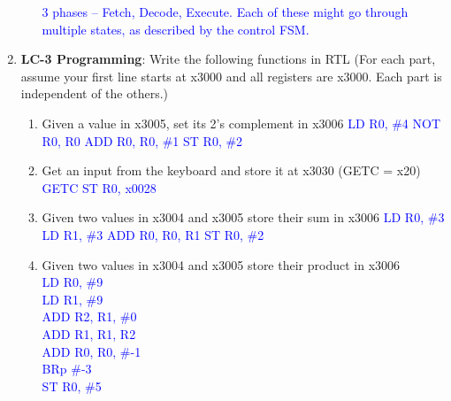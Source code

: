\documentclass{article}
\begin{document}
\begin{enumerate}[label=(\alph*)]
\begin{enumerate}[label=(\roman*),itemsep = 10pt]
            \newline \textcolor{blue}{3 phases -- Fetch, Decode, Execute. Each of these might go through multiple states, as described by the control FSM.}
        \end{enumerate}
        \item \textbf{LC-3 Programming}: Write the following functions in RTL (For each part, assume your first line starts at x3000 and all registers are x3000. Each part is independent of the others.)
        \begin{enumerate}[label=(\roman*),itemsep = 10pt]
            \item Given a value in x3005, set its 2’s complement in x3006
            \newline \textcolor{blue}{LD R0, \#4}
            \newline \textcolor{blue}{NOT R0, R0}
            \newline \textcolor{blue}{ADD R0, R0, \#1}
            \newline \textcolor{blue}{ST R0, \#2}
            \item Get an input from the keyboard and store it at x3030 (GETC = x20)
            \newline \textcolor{blue}{GETC}
            \newline \textcolor{blue}{ST R0, x0028}
            \item Given two values in x3004 and x3005 store their sum in x3006
            \newline \textcolor{blue}{LD R0, \#3}
            \newline \textcolor{blue}{LD R1, \#3}
            \newline \textcolor{blue}{ADD R0, R0, R1}
            \newline \textcolor{blue}{ST R0, \#2}
            \item Given two values in x3004 and x3005 store their product in x3006
            \\ \textcolor{blue}{LD R0, \#9}
            \\ \textcolor{blue}{LD R1, \#9}
            \\ \textcolor{blue}{ADD R2, R1, \#0}
            \\ \textcolor{blue}{ADD R1, R1, R2}
            \\ \textcolor{blue}{ADD R0, R0, \#-1}
            \\ \textcolor{blue}{BRp \#-3}
            \\ \textcolor{blue}{ST R0, \#5}
        \end{enumerate}

\end{enumerate}
\end{document}
